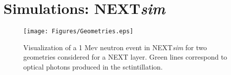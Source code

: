 %
%
%
%
%
%
%
%
%
%
%
%
%
%
%
%
%
%
%
%
%
%


\section{Simulations: NEXT\emph{sim}}
\begin{figure*}[htp]
 \centering
  \texttt{[image: Figures/Geometries.eps]}
  \caption{Visualization of a 1 Mev neutron event in NEXT\emph{sim} for two geometries considered for a NEXT layer. Green lines correspond to optical photons produced in the sctintillation.}
  \label{fig:Geometries}
\end{figure*} 


